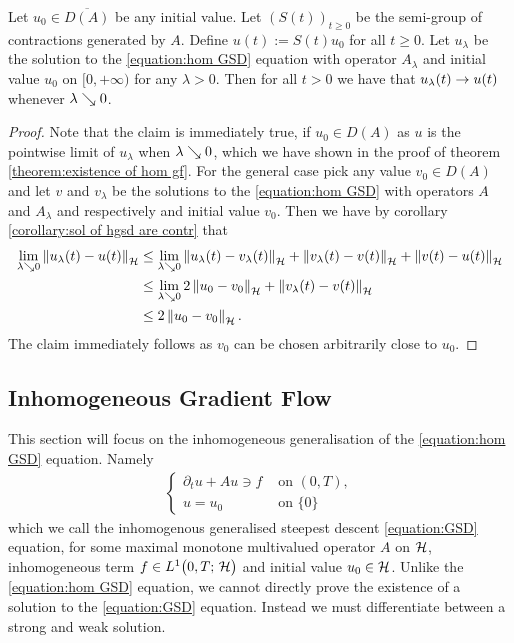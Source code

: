 \begin{corollary}\label{corollary:yos app of sem grp of contr conv}
	Let $ u_0\in \overline{D(A)} $ be any initial value.
	Let $ (S(t))_{t\geq 0} $ be the semi-group 
	of contractions generated by
	$ A $. Define $ u(t):=S(t)u_0 $ for all
	$ t\geq 0 $. Let $ u_\lambda $ be the
	solution to the \ref{equation:hom GSD} equation
	with operator $ A_\lambda $ and initial
	value $ u_0 $ on $ [0,\plus\infty) $
	for any $ \lambda>0 $. Then for all
	$ t>0 $ we have that $ u_\lambda(t)\rightarrow u(t) $
	whenever $ \lambda\searrow 0 $.
\end{corollary}
\begin{proof}
	Note that the claim is immediately true,
	if $ u_0\in D(A) $ as $ u $ is the 
	pointwise limit of $ u_\lambda $
	when $ \lambda\searrow 0 $, which we have shown in the
	proof of theorem \ref{theorem:existence of hom gf}.
	For the general case pick 
	any value $ v_0\in D(A) $ and let
	$ v $ and $ v_\lambda $ be the solutions 
	to the \ref{equation:hom GSD}
	with operators $ A $ and $ A_\lambda $ and
	respectively and initial value $ v_0 $.
	Then we have by corollary \ref{corollary:sol of hgsd are contr}
	that
	\begin{align*}
		\lim_{\lambda\searrow 0}\left\Vert u_\lambda(t)-u(t)\right\Vert_{\mathcal{H}}
		&\leq \lim_{\lambda\searrow 0}\left\Vert u_\lambda(t)-v_\lambda(t)\right\Vert_{\mathcal{H}}
		+\left\Vert v_\lambda(t)-v(t)\right\Vert_{\mathcal{H}}
		+\left\Vert v(t)-u(t)\right\Vert_{\mathcal{H}}\\
		&\leq \lim_{\lambda\searrow 0}2\left\Vert u_0-v_0\right\Vert_{\mathcal{H}}+\left\Vert v_\lambda(t)-v(t)\right\Vert_{\mathcal{H}}\\
		&\leq 2\left\Vert u_0-v_0\right\Vert_{\mathcal{H}}.
	\end{align*} 
	The claim immediately follows as $ v_0 $ can be
	chosen arbitrarily close to $ u_0 $. 
\end{proof}

\subsection{Inhomogeneous Gradient Flow}

This section will focus on the inhomogeneous generalisation
of the \ref{equation:hom GSD} equation. Namely
\begin{align}\label{equation:GSD}\tag{GSD}
	\begin{cases}
		\partial_t u+Au \ni f & \text{ on }(0,T),\\
		u=u_0 & \text{ on }\{0\}
	\end{cases}
\end{align}
which we call the inhomogenous generalised 
steepest descent \ref{equation:GSD} equation, for 
some maximal monotone multivalued operator $ A $
on $ \mathcal{H} $, inhomogeneous term $ f \in L^{1}\big(0,T;\,\mathcal{H}\big) $ and
initial value $ u_0\in\mathcal{H} $. 
Unlike the \ref{equation:hom GSD} equation, we cannot
directly prove the existence of a solution to the
\ref{equation:GSD} equation. Instead we must differentiate
between a strong and weak solution.\medskip


